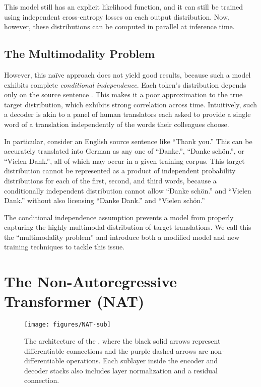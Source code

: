 \documentclass{article} \usepackage{iclr2018_conference,times}
\begin{document}
This model still has an explicit likelihood function, and it can still be trained using independent cross-entropy losses on each output distribution. Now, however, these distributions can be computed in parallel at inference time. 

\subsection{The Multimodality Problem}
However, this na\"{i}ve approach does not yield good results, because such a model exhibits complete \emph{conditional independence}.
Each token's distribution   depends only on the source sentence . 
This makes it a poor approximation to the true target distribution, which exhibits strong correlation across time. 
Intuitively, such a decoder is akin to a panel of human translators each asked to provide a single word of a translation independently of the words their colleagues choose.

In particular, consider an English source sentence like ``Thank you.'' This can be accurately translated into German as any one of ``Danke.'', ``Danke sch\"{o}n.'', or ``Vielen Dank.'', all of which may occur in a given training corpus. This target distribution cannot be represented as a product of independent probability distributions for each of the first, second, and third words, because a conditionally independent distribution cannot allow ``Danke sch\"{o}n.'' and ``Vielen Dank.'' without also licensing ``Danke Dank.'' and ``Vielen sch\"{o}n.''

The conditional independence assumption prevents a model from properly capturing the highly multimodal distribution of target translations.
We call this the ``multimodality problem'' and introduce both a modified model and new training techniques to tackle this issue.

\section{The Non-Autoregressive Transformer (NAT)}\label{mainModelSection}

\begin{figure}
\centering
\texttt{[image: figures/NAT-sub]}
\caption{\label{fig.diagram} The architecture of the \model{}, where the black solid arrows represent differentiable connections and the purple dashed arrows are non-differentiable operations. Each sublayer inside the encoder and decoder stacks also includes layer normalization and a residual connection.}
\vspace{-20pt}
\end{figure}
\end{document}
